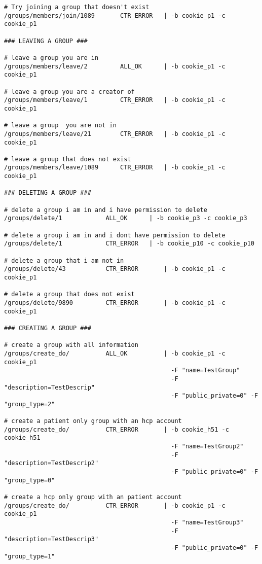 \begin{verbatim}
# Try joining a group that doesn't exist
/groups/members/join/1089		CTR_ERROR	| -b cookie_p1 -c cookie_p1

### LEAVING A GROUP ###

# leave a group you are in 
/groups/members/leave/2			ALL_OK		| -b cookie_p1 -c cookie_p1

# leave a group you are a creator of
/groups/members/leave/1			CTR_ERROR	| -b cookie_p1 -c cookie_p1

# leave a group  you are not in
/groups/members/leave/21 		CTR_ERROR	| -b cookie_p1 -c cookie_p1

# leave a group that does not exist 
/groups/members/leave/1089		CTR_ERROR	| -b cookie_p1 -c cookie_p1

### DELETING A GROUP ###

# delete a group i am in and i have permission to delete
/groups/delete/1			ALL_OK		| -b cookie_p3 -c cookie_p3

# delete a group i am in and i dont have permission to delete
/groups/delete/1			CTR_ERROR	| -b cookie_p10 -c cookie_p10

# delete a group that i am not in
/groups/delete/43			CTR_ERROR		| -b cookie_p1 -c cookie_p1

# delete a group that does not exist 
/groups/delete/9890			CTR_ERROR		| -b cookie_p1 -c cookie_p1

### CREATING A GROUP ###

# create a group with all information
/groups/create_do/ 			ALL_OK			| -b cookie_p1 -c cookie_p1 
                                              -F "name=TestGroup" 
                                              -F "description=TestDescrip"
                                              -F "public_private=0" -F "group_type=2"

# create a patient only group with an hcp account
/groups/create_do/ 			CTR_ERROR		| -b cookie_h51 -c cookie_h51 
                                              -F "name=TestGroup2" 
                                              -F "description=TestDescrip2" 
                                              -F "public_private=0" -F "group_type=0"

# create a hcp only group with an patient account
/groups/create_do/ 			CTR_ERROR		| -b cookie_p1 -c cookie_p1 
                                              -F "name=TestGroup3" 
                                              -F "description=TestDescrip3" 
                                              -F "public_private=0" -F "group_type=1"


\end{verbatim}
